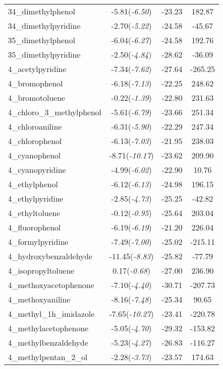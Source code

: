 \documentclass{amsart}
\begin{document}
\begin{center}
\begin{longtable}{l|c|c|c}
34\_dimethylphenol & -5.81(\textit{-6.50}) & -23.23 & 182.87 \\ 
34\_dimethylpyridine & -2.70(\textit{-5.22}) & -24.58 & -45.67 \\ 
35\_dimethylphenol & -6.04(\textit{-6.27}) & -24.58 & 192.76 \\ 
35\_dimethylpyridine & -2.50(\textit{-4.84}) & -28.62 & -36.09 \\ 
4\_acetylpyridine & -7.34(\textit{-7.62}) & -27.64 & -265.25 \\ 
4\_bromophenol & -6.18(\textit{-7.13}) & -22.25 & 248.62 \\ 
4\_bromotoluene & -0.22(\textit{-1.39}) & -22.80 & 231.63 \\ 
4\_chloro\_3\_methylphenol & -5.61(\textit{-6.79}) & -23.66 & 251.34 \\ 
4\_chloroaniline & -6.31(\textit{-5.90}) & -22.29 & 247.34 \\ 
4\_chlorophenol & -6.13(\textit{-7.03}) & -21.95 & 238.03 \\ 
4\_cyanophenol & -8.71(\textit{-10.17}) & -23.62 & 209.90 \\ 
4\_cyanopyridine & -4.99(\textit{-6.02}) & -22.90 & 10.76 \\ 
4\_ethylphenol & -6.12(\textit{-6.13}) & -24.98 & 196.15 \\ 
4\_ethylpyridine & -2.85(\textit{-4.73}) & -25.25 & -42.82 \\ 
4\_ethyltoluene & -0.12(\textit{-0.95}) & -25.64 & 203.04 \\ 
4\_fluorophenol & -6.19(\textit{-6.19}) & -21.20 & 226.04 \\ 
4\_formylpyridine & -7.49(\textit{-7.00}) & -25.02 & -215.11 \\ 
4\_hydroxybenzaldehyde & -11.45(\textit{-8.83}) & -25.82 & -77.79 \\ 
4\_isopropyltoluene & 0.17(\textit{-0.68}) & -27.00 & 236.90 \\ 
4\_methoxyacetophenone & -7.10(\textit{-4.40}) & -30.71 & -207.73 \\ 
4\_methoxyaniline & -8.16(\textit{-7.48}) & -25.34 & 90.65 \\ 
4\_methyl\_1h\_imidazole & -7.65(\textit{-10.27}) & -23.41 & -220.78 \\ 
4\_methylacetophenone & -5.05(\textit{-4.70}) & -29.32 & -153.82 \\ 
4\_methylbenzaldehyde & -5.23(\textit{-4.27}) & -26.83 & -116.27 \\ 
4\_methylpentan\_2\_ol & -2.28(\textit{-3.73}) & -23.57 & 174.63 \\ 

\end{longtable}
\end{center}
\end{document}
